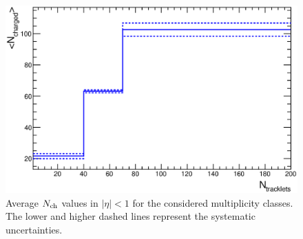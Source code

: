\begin{figure}[h]
\centering
 \includegraphics[width=.55\textwidth]{FigCap6/AverNchAndTotalSystUnc.eps}
 \caption{Average $N_{\rm ch}$ values in $|\eta|<1$ for the considered multiplicity classes. The lower and higher dashed lines represent the systematic uncertainties.}
 \label{fig:Nch}
\end{figure}

